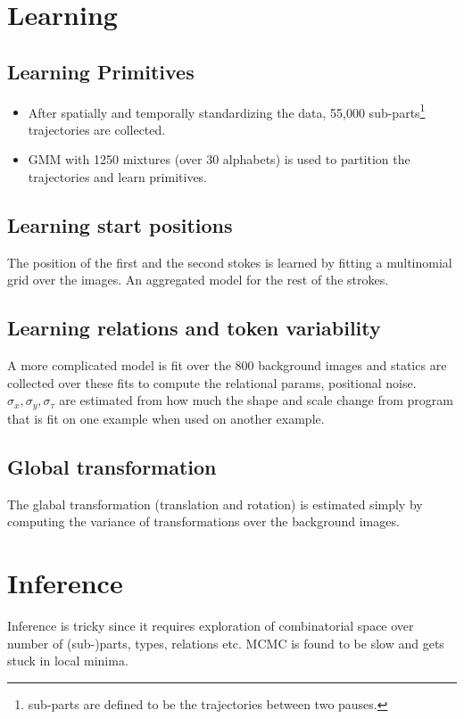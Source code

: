 \documentclass[11pt]{article}
\begin{document}
\section{Learning}
\label{sec-8}
\subsection{Learning Primitives}
\label{sec-8-1}
\begin{itemize}
\item After spatially and temporally standardizing the data, 55,000 sub-parts\footnote{sub-parts are defined to be the trajectories between two pauses.} trajectories are collected.
\item GMM with 1250 mixtures (over 30 alphabets) is used to partition the trajectories and learn primitives.
\end{itemize}
\subsection{Learning start positions}
\label{sec-8-2}
The position of the first and the second stokes is learned by fitting a multinomial grid over the images.
An aggregated model for the rest of the strokes. 
\subsection{Learning relations and token variability}
\label{sec-8-3}
A more complicated model is fit over the 800 background images and statics are collected over these fits to compute the relational params, positional noise. 
$\sigma_x, \sigma_y, \sigma_\tau$ are estimated from how much the shape and scale change from program that is fit on one example when used on another example.
\subsection{Global transformation}
\label{sec-8-4}
The glabal transformation (translation and rotation) is estimated simply by computing the variance of transformations over the background images.

\section{Inference}
\label{sec-9}
Inference is tricky since it requires exploration of combinatorial space over number of (sub-)parts, types, relations etc. 
MCMC is found to be slow and gets stuck in local minima.
\end{document}
